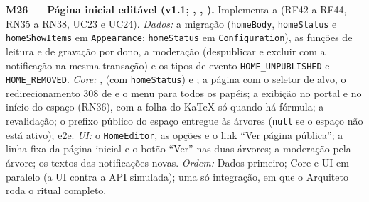 \textbf{M26 --- Página inicial editável (v1.1; , , ).} Implementa a  (RF42 a RF44, RN35 a RN38, UC23 e UC24). \emph{Dados:} a migração (\texttt{homeBody}, \texttt{homeStatus} e \texttt{homeShowItems} em \texttt{Appearance}; \texttt{homeStatus} em \texttt{Configuration}), as funções de leitura e de gravação por dono, a moderação (despublicar e excluir com a notificação na mesma transação) e os tipos de evento \texttt{HOME\_UNPUBLISHED} e \texttt{HOME\_REMOVED}. \emph{Core:} ,  (com \texttt{homeStatus}) e ; a página  com o seletor de alvo, o redirecionamento 308 de  e o menu para todos os papéis; a exibição no portal e no início do espaço (RN36), com a folha do KaTeX só quando há fórmula; a revalidação; o prefixo público do espaço entregue às árvores (\texttt{null} se o espaço não está ativo); e2e. \emph{UI:} o \texttt{HomeEditor}, as opções e o link ``Ver página pública''; a linha fixa da página inicial e o botão ``Ver'' nas duas árvores; a moderação pela árvore; os textos das notificações novas. \emph{Ordem:} Dados primeiro; Core e UI em paralelo (a UI contra a API simulada); uma só integração, em que o Arquiteto roda o ritual completo.


